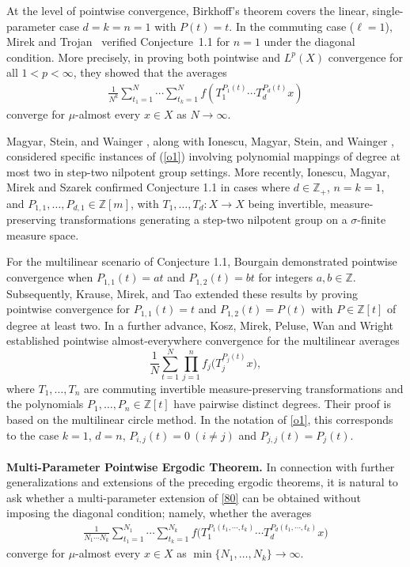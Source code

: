 \documentclass[10pt,a4paper]{amsart}
\numberwithin{equation}{section}
\begin{document}
\medskip






At the level of pointwise convergence, Birkhoff’s theorem covers the linear, single-parameter case $d=k=n=1$ with $P(t)=t$.  In the commuting case ($\ell=1$), Mirek and Trojan~\cite{MT} verified Conjecture~1.1 for $n=1$ under the diagonal condition. More precisely, in proving both pointwise and $L^{p}(X)$ convergence for all $1<p<\infty$, they showed that the averages
\begin{align}\label{80}
	\frac{1}{N^{k}}
	\sum_{t_1=1}^{N}\cdots\sum_{t_k=1}^{N}
	f\left(
	T_1^{P_1(t)}\cdots T_d^{P_d(t)}x
	\right)
\end{align}
converge for $\mu$-almost every $x \in X$ as $N \to \infty$.


Magyar, Stein, and Wainger \cite{MSW2}, along with Ionescu, Magyar, Stein, and Wainger \cite{IMSW}, considered specific instances of (\ref{o1}) involving polynomial mappings of degree at most two in step-two nilpotent group settings. More recently, Ionescu, Magyar,  Mirek and Szarek \cite{IMMS1} confirmed Conjecture 1.1 in cases where $d \in \mathbb{Z}_+$, $n= k = 1$, and $P_{1,1}, \ldots, P_{d,1} \in \mathbb{Z}[m]$, with $T_1, \ldots, T_d: X \to X$ being invertible, measure-preserving transformations generating a step-two nilpotent group on a $\sigma$-finite measure space.

For the multilinear scenario of Conjecture 1.1, Bourgain \cite{B44} demonstrated pointwise convergence when $P_{1,1}(t) = at$ and $P_{1,2}(t) = bt$ for integers $a, b \in \mathbb{Z}$. Subsequently, Krause, Mirek, and Tao \cite{KMT} extended these results by proving pointwise convergence  for $P_{1,1}(t) = t$ and $P_{1,2}(t) = P(t)$ with $P \in \mathbb{Z}[t]$ of degree at least two.
In a further advance, Kosz, Mirek, Peluse, Wan and Wright \cite{KMPW} established pointwise almost-everywhere convergence for the  multilinear averages
\[
\frac{1}{N}\sum_{t=1}^{N}
\prod_{j=1}^{n} f_j\bigl(T_j^{P_j(t)}x\bigr),
\]
where \(T_1,\dots,T_n\) are commuting invertible measure-preserving transformations and the polynomials \(P_1,\dots,P_n\in\mathbb Z[t]\) have pairwise distinct degrees. Their proof is based on the multilinear circle method. In the notation of \eqref{o1}, this corresponds to the case \(k=1\), \(d=n\),
$
P_{i,j}(t)=0 \ (i\neq j)$  and $ 
P_{j,j}(t)=P_j(t).
$\\\\
\noindent \textbf{Multi-Parameter Pointwise Ergodic Theorem.}
In connection with further generalizations and extensions of the
preceding ergodic theorems, it is natural to ask whether a
multi-parameter extension of \eqref{80} can be obtained without
imposing the diagonal condition; namely, whether the averages
\begin{align*}
	\frac{1}{N_1\cdots N_k}
\sum_{t_1=1}^{N_1}\cdots\sum_{t_k=1}^{N_k}
	f\bigl(T_1^{P_1(t_1, \cdots, t_k)} \cdots T_d^{P_d(t_1, \cdots, t_k)} x\bigr)
\end{align*}
converge for $\mu$-almost every $x \in X$ as $\min\{N_1,\dots,N_k\}\to\infty$.
\end{document}
